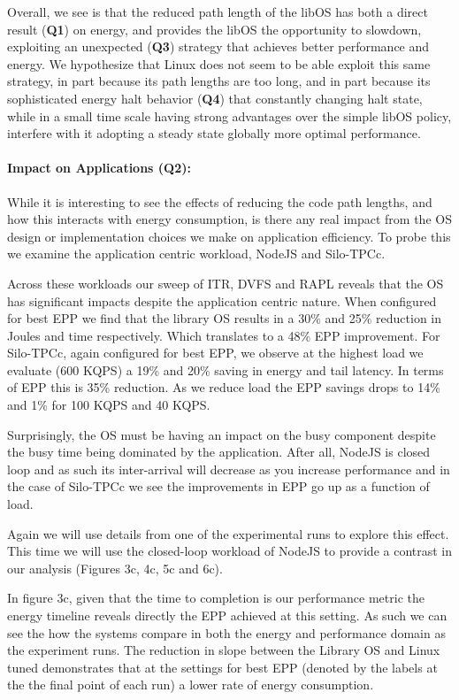 Overall, we see is that the reduced path length of the libOS has both a direct result ({\bf Q1}) on energy, and provides the libOS the opportunity to slowdown, exploiting an unexpected  ({\bf Q3}) strategy that achieves better performance and energy. 
We hypothesize that Linux does not seem to be able exploit this same strategy, in part because its path lengths are too long, and in part because its sophisticated energy halt behavior ({\bf Q4}) that constantly changing halt state, while in a small time scale having strong advantages over the simple libOS policy, interfere with it adopting a steady state globally more optimal performance.  


\vspace{-.2in}
\paragraph{Impact on Applications (Q2):}
While it is interesting to see the effects of reducing the code path lengths, and how this interacts with energy consumption, is there any real impact from the OS design or implementation choices we make on application efficiency.  To probe this we examine the application centric workload, NodeJS and Silo-TPCc.  

Across these workloads our sweep of ITR, DVFS and RAPL reveals that the OS has significant impacts despite the application centric nature.  
When configured for best EPP we find that the library OS results in a 30\% and 25\% reduction in Joules and time respectively. Which translates to a 48\% EPP improvement.    
For Silo-TPCc, again configured for best EPP, we observe at the highest load we evaluate (600 KQPS) a 19\% and 20\% saving in energy and tail latency.  
In terms of EPP this is 35\% reduction.  
As we reduce load the EPP savings drops to 14\% and 1\% for 100 KQPS and 40 KQPS.  

Surprisingly, the OS must be having an impact on the busy component despite the busy time being dominated by the application.  
After all, NodeJS is closed loop and as such its inter-arrival will decrease as you increase performance and in the case of Silo-TPCc we see the improvements in EPP go up as a function of load.  

Again we will use details from one of the experimental runs to explore this effect.  
This time we will use the closed-loop workload of NodeJS to provide a contrast in our analysis (Figures 3c, 4c, 5c and 6c).  

In figure 3c, given that the time to completion is our performance metric the energy timeline reveals directly the EPP achieved at this setting. 
As such we can see the how the systems compare in both the energy and performance domain as the experiment runs.  
The reduction in slope between the Library OS and Linux tuned demonstrates that at the settings for best EPP (denoted by the labels at the the final point of each run) a lower rate of energy consumption.  

